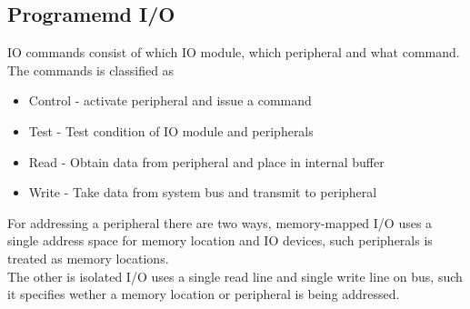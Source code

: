 \documentclass[12pt, a4paper]{article}
\begin{document}
		\subsection{Programemd I/O}
			IO commands consist of which IO module, which peripheral and what command.\\
			The commands is classified as
			\begin{itemize}
				\item Control - activate peripheral and issue a command
				\item Test - Test condition of IO module and peripherals
				\item Read - Obtain data from peripheral and place in internal buffer
				\item Write - Take data from system bus and transmit to peripheral
			\end{itemize}
			For addressing a peripheral there are two ways, memory-mapped I/O uses a single address space for memory location and IO devices, such peripherals is treated as memory locations.\\
			The other is isolated I/O uses a single read  line and single write line on bus, such it specifies wether a memory location or peripheral is being addressed. 
\end{document}
